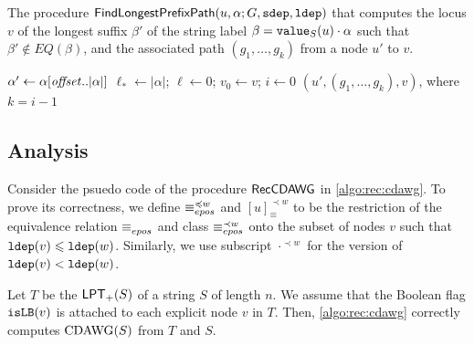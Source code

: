 \documentclass{article}
\begin{document}
\begin{toappendix}
  
\begin{algorithm}[t]
  \caption{
The procedure $\FindNonEquivLocus(u, \alpha; G, \sdep, \ldep)$ that computes the locus $v$ of the longest suffix $\beta'$ of the string label $\beta = \Value(u)\cdot\alpha$ such that $\beta' \not\in EQ(\beta)$, and the associated path $(g_1, \dots, g_k)$ from a node $u'$ to $v$. 
  }\label{algo:find:ne:locus}
  $\alpha' \gets \alpha[\id{offset}..|\alpha|]$\; 
  $\ell_* \gets |\alpha|$; $\ell \gets 0$; $v_0 \gets v$; $i \gets 0$\;     
  \Return $(u', (g_1, \dots, g_k), v)$, where $k = i-1$\; 
\end{algorithm}
\end{toappendix}

\subsection{Analysis}

Consider the psuedo code of the procedure $\RecCDAWG$ in \cref{algo:rec:cdawg}. To prove its correctness, we define  
  $\eqepos[\preceq w]$ and $[u]^{\prec w}_{\equiv}$ to be the restriction of
  the equivalence relation $\eqepos[]$ and class $\eqepos[\prec w]$
  onto the subset of nodes $v$ such that $\ldep(v) \le \ldep(w)$.
  Similarly, we use subscript $\cdot^{\prec w}$ for the version of $\ldep(v) < \ldep(w)$.


\begin{lemmarep}[correctness]\label{lem:cdawg:correctness}
  Let $T$ be the $\LPT(S)$ of a string $S$ of length $n$. 
  We assume that the Boolean flag $\op{isLB}(v)$ is attached to each explicit node $v$ in $T$. Then, \cref{algo:rec:cdawg} correctly computes $\CDAWG(S)$ from $T$ and $S$. 
\end{lemmarep}
\end{document}
